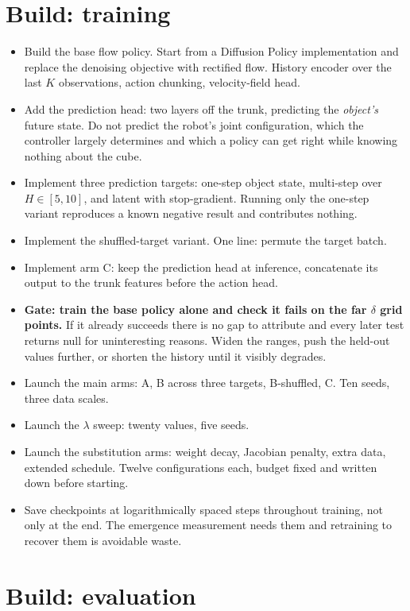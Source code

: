 \documentclass[9pt]{extarticle}
\newcommand{\ck}{\item[$\square$]}
\begin{document}
\section{Build: training}

\begin{itemize}
\ck Build the base flow policy. Start from a Diffusion Policy implementation and replace the denoising objective with rectified flow. History encoder over the last $K$ observations, action chunking, velocity-field head.
\ck Add the prediction head: two layers off the trunk, predicting the \emph{object's} future state. Do not predict the robot's joint configuration, which the controller largely determines and which a policy can get right while knowing nothing about the cube.
\ck Implement three prediction targets: one-step object state, multi-step over $H \in [5,10]$, and latent with stop-gradient. Running only the one-step variant reproduces a known negative result and contributes nothing.
\ck Implement the shuffled-target variant. One line: permute the target batch.
\ck Implement arm C: keep the prediction head at inference, concatenate its output to the trunk features before the action head.
\ck \textbf{Gate: train the base policy alone and check it fails on the far $\delta$ grid points.} If it already succeeds there is no gap to attribute and every later test returns null for uninteresting reasons. Widen the ranges, push the held-out values further, or shorten the history until it visibly degrades.
\ck Launch the main arms: A, B across three targets, B-shuffled, C. Ten seeds, three data scales.
\ck Launch the $\lambda$ sweep: twenty values, five seeds.
\ck Launch the substitution arms: weight decay, Jacobian penalty, extra data, extended schedule. Twelve configurations each, budget fixed and written down before starting.
\ck Save checkpoints at logarithmically spaced steps throughout training, not only at the end. The emergence measurement needs them and retraining to recover them is avoidable waste.
\end{itemize}

\section{Build: evaluation}
\end{document}
